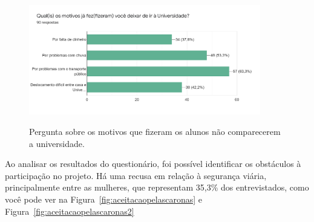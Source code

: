 \begin{figure}[!hbtp]
	\centering
	\caption{Pergunta sobre os motivos que fizeram os alunos não comparecerem a universidade.}
	\includegraphics[width=0.9\textwidth]{./04-figuras/questionario/1.png}
	\label{fig:dadosmeiodetransporte}
\end{figure}





Ao analisar os resultados do questionário, foi possível identificar os obstáculos à participação no projeto. Há uma recusa em relação à segurança viária, principalmente entre as mulheres, que representam 35,3\% dos entrevistados, como você pode ver na Figura~\ref{fig:aceitacaopelascaronas} e Figura~\ref{fig:aceitacaopelascaronas2}%

